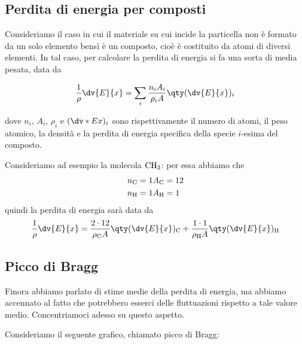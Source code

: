 \subsection{Perdita di energia per composti}

Consideriamo il caso in cui il materiale su cui incide la particella non è formato da un solo elemento bensì è un composto, cioè è costituito da atomi di diversi elementi. In tal caso, per calcolare la perdita di energia si fa una sorta di media pesata, data da

\begin{equation*}
    \frac{1}{\rho} \dv{E}{x}
    =\sum_i \frac{n_i A_i}{\rho_i A} \qty( \dv{E}{x} )_i
\end{equation*}

dove $n_i$, $A_i$, $\rho_i$ e $(\dv*{E}{x})_i$ sono rispettivamente il numero di atomi, il peso atomico, la densità e la perdita di energia specifica della specie $i$-esima del composto.

Consideriamo ad esempio la molecola $\rm CH_2$: per essa abbiamo che
\begin{eqnarray*}
    n_{\rm C}=1 & A_{\rm C}=12\\
    n_{\rm H}=1 & A_{\rm H}=1
\end{eqnarray*}
quindi la perdita di energia sarà data da
\begin{equation*}
    \frac{1}{\rho} \dv{E}{x}
    =\frac{2 \cdot 12}{\rho_{\rm C} A} \qty( \dv{E}{x} )_{\rm C} + \frac{1 \cdot 1}{\rho_{\rm H} A} \qty( \dv{E}{x} )_{\rm H}
\end{equation*}

\subsection{Picco di Bragg}

Finora abbiamo parlato di stime medie della perdita di energia, ma abbiamo accennato al fatto che potrebbero esserci delle fluttuazioni rispetto a tale valore medio. Concentriamoci adesso su questo aspetto.

Consideriamo il seguente grafico, chiamato picco di Bragg:

